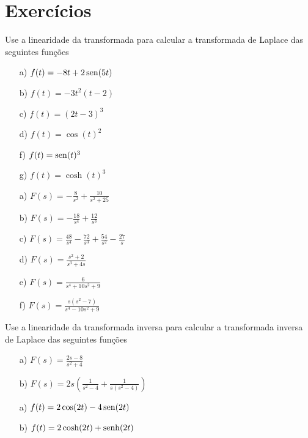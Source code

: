 \section{Exercícios}
\begin{Exercise} Use a linearidade da transformada para calcular a transformada de Laplace das seguintes funções
 \begin{itemize}
  \item[a)] $f(t)=-8t+2\operatorname{sen}(5t)$ 
  \item[b)] $f(t)=-3t^2(t-2)$
  \item[c)] $f(t)=(2t-3)^3$
  \item[d)] $f(t)=\cos(t)^2$
  \item[f)] $f(t)=\operatorname{sen}(t)^3$
  \item[g)] $f(t)=\cosh(t)^3$
 \end{itemize}

 
 \end{Exercise}
\begin{Answer}
 \begin{itemize}
  \item[a)] $F(s)=-\frac{8}{s^2}+\frac{10}{s^2+25}$ 
  \item[b)] $F(s)=-\frac{18}{s^4}+\frac{12}{s^3}$
  \item[c)] $F(s)=\frac{48}{s^4}-\frac{72}{s^3}+\frac{54}{s^2}-\frac{27}{s}$
  \item[d)] $F(s)=\frac{s^2+2}{s^3+4s}$
  \item[e)] $F(s)=\frac{6}{s^4+10s^2+9}$
  \item[f)] $F(s)=\frac{s(s^2-7)}{s^4-10s^2+9}$
 \end{itemize}
\end{Answer}
\begin{Exercise} Use a linearidade da transformada inversa para calcular a transformada inversa de Laplace das seguintes funções
 \begin{itemize}
  \item[a)] $F(s)=\frac{2s-8}{s^2+4}$ 
  \item[b)] $F(s)=2s\left(\frac{1}{s^2-4}+\frac{1}{s(s^2-4)}\right)$
 \end{itemize}
 
 \end{Exercise}
\begin{Answer}
 \begin{itemize}
  \item[a)] $f(t)=2\cos(2t)-4\operatorname{sen}(2t)$
  \item[b)] $f(t)=2\cosh(2t)+\operatorname{senh}(2t)$
 \end{itemize}
\end{Answer}
